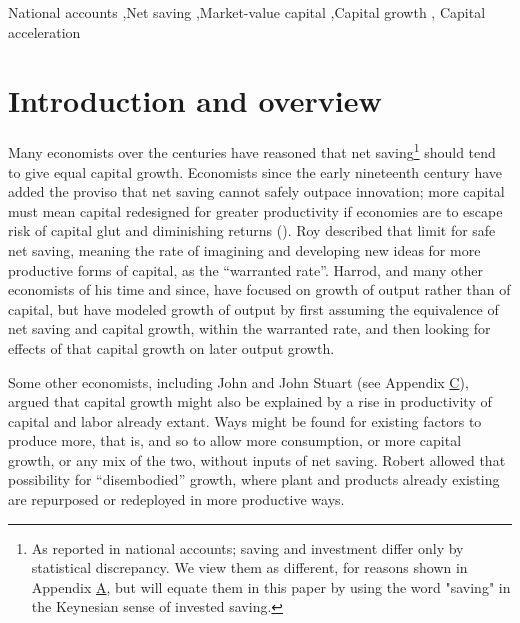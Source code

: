 \documentclass[a4padisinvitingper,fleqn]{latex_styles/cas-sc}
\begin{document}

\begin{keywords}
National accounts \sep Net
saving \sep Market-value capital \sep Capital
growth \sep 
Capital acceleration

\end{keywords}

\maketitle

\hypertarget{introduction}{%
\section{Introduction and overview}\label{introduction}}

Many economists over the centuries have reasoned that net saving\footnote{As reported in national accounts; saving and investment differ only by statistical discrepancy. We view them as different, for reasons shown in Appendix \hyperref[appendix-a]{A}, but will equate them in this paper by using the word "saving" in the Keynesian sense of invested saving.} should tend to give equal capital growth. Economists since the early
nineteenth century have added the proviso that net saving cannot
safely outpace innovation; more capital must mean capital redesigned for
greater productivity if economies are to escape risk of capital glut and
diminishing returns
(\citet{westEssayApplicationCapital1815, ricardoEssayProfitsVol1815, malthusEnquiryNatureProgress1815}).
Roy \citet{harrodEssayDynamicTheory1939}
described that limit for safe net saving, meaning the rate of
imagining and developing new ideas for more productive forms of capital,
as the ``warranted rate''. Harrod, and many other economists of his time
and since, have focused on growth of output rather than of capital, but
have modeled growth of output by first assuming the equivalence of net
saving and capital growth, within the warranted rate, and then
looking for effects of that capital growth on later output growth.

Some other economists, including John  \citet{raeNewPrinciplesPolitical1834} and John Stuart 
\citet{millPrinciplesPoliticalEconomy1848} (see Appendix \hyperref[appendix-c]{C}), argued that capital growth might also be explained
by a rise in productivity of capital and labor already extant. Ways
might be found for existing factors to produce more, that is, and so to
allow more consumption, or more capital growth, or any mix of the two,
without inputs of net saving. Robert
\citet{solowTECHNICALCHANGEAGGREGATE1957} allowed that possibility for
``disembodied'' growth, where plant and products already existing are
repurposed or redeployed in more productive ways.
\end{document}
